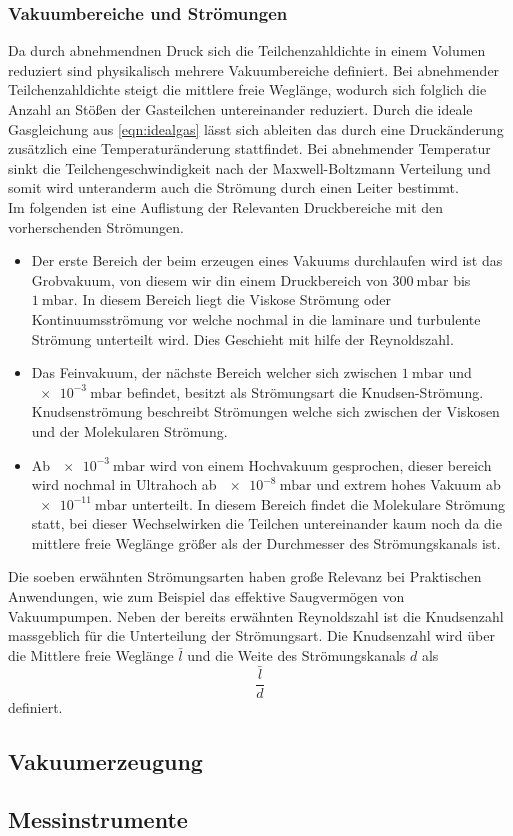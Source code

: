 \subsubsection{Vakuumbereiche und Strömungen}
Da durch abnehmendnen Druck sich die Teilchenzahldichte in einem Volumen reduziert sind physikalisch mehrere Vakuumbereiche 
definiert. Bei abnehmender Teilchenzahldichte steigt die mittlere freie Weglänge, wodurch sich folglich die Anzahl an Stößen der 
Gasteilchen untereinander reduziert. Durch die ideale Gasgleichung aus \autoref{eqn:idealgas} lässt sich ableiten das durch eine 
Druckänderung zusätzlich eine Temperaturänderung stattfindet. Bei abnehmender Temperatur sinkt die Teilchengeschwindigkeit nach der 
Maxwell-Boltzmann Verteilung und somit wird unteranderm auch die Strömung durch einen Leiter bestimmt.\\
Im folgenden ist eine Auflistung der Relevanten Druckbereiche mit den vorherschenden Strömungen.


\begin{itemize}
    \item Der erste Bereich der beim erzeugen eines Vakuums durchlaufen wird ist das Grobvakuum, von diesem wir din einem 
    Druckbereich von $\SI{300}{\milli\bar}$ bis $\SI{1}{\milli\bar}$. In diesem Bereich liegt die Viskose Strömung oder Kontinuumsströmung 
    vor welche nochmal in die laminare und turbulente Strömung unterteilt wird. Dies Geschieht mit hilfe der Reynoldszahl.

    \item Das Feinvakuum, der nächste Bereich welcher sich zwischen $\SI{1}{\milli\bar}$ und $\SI{e-3}{\milli\bar}$ befindet, 
    besitzt als Strömungsart die Knudsen-Strömung. Knudsenströmung beschreibt Strömungen welche sich zwischen der Viskosen und der 
    Molekularen Strömung.

    \item Ab $\SI{e-3}{\milli\bar}$ wird von einem Hochvakuum gesprochen, dieser bereich wird nochmal in Ultrahoch ab $\SI{e-8}{\milli\bar}$ 
    und extrem hohes Vakuum ab $\SI{e-11}{\milli\bar}$ unterteilt. In diesem Bereich findet die Molekulare Strömung statt, bei dieser 
    Wechselwirken die Teilchen untereinander kaum noch da die mittlere freie Weglänge größer als der Durchmesser des Strömungskanals ist.
    
\end{itemize}

Die soeben erwähnten Strömungsarten haben große Relevanz bei Praktischen Anwendungen, wie zum Beispiel das effektive Saugvermögen 
von Vakuumpumpen. Neben der bereits erwähnten Reynoldszahl ist die Knudsenzahl massgeblich für die Unterteilung der Strömungsart.
Die Knudsenzahl wird über die Mittlere freie Weglänge $\bar l$ und die Weite des Strömungskanals $d$ als
\begin {equation}
 \frac{\bar l}{d}
\label{eqn:knudsen}
\end{equation}
definiert.\\

\subsection{Vakuumerzeugung}


\subsection{Messinstrumente}